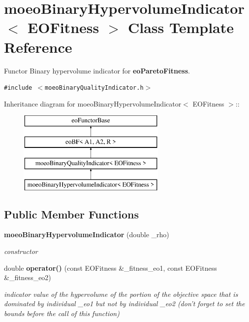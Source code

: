 \section{moeo\-Binary\-Hypervolume\-Indicator$<$ EOFitness $>$ Class Template Reference}
\label{classmoeoBinaryHypervolumeIndicator}
Functor Binary hypervolume indicator for {\bf eo\-Pareto\-Fitness}.  


{\tt \#include $<$moeo\-Binary\-Quality\-Indicator.h$>$}

Inheritance diagram for moeo\-Binary\-Hypervolume\-Indicator$<$ EOFitness $>$::\begin{figure}[H]
\begin{center}
\leavevmode
\includegraphics[height=4cm]{classmoeoBinaryHypervolumeIndicator}
\end{center}
\end{figure}
\subsection*{Public Member Functions}
\begin{CompactItemize}
\item 
{\bf moeo\-Binary\-Hypervolume\-Indicator} (double \_\-rho)
\begin{CompactList}\small\item\em constructor \item\end{CompactList}\item 
double {\bf operator()} (const EOFitness \&\_\-fitness\_\-eo1, const EOFitness \&\_\-fitness\_\-eo2)
\begin{CompactList}\small\item\em indicator value of the hypervolume of the portion of the objective space that is dominated by individual \_\-eo1 but not by individual \_\-eo2 (don't forget to set the bounds before the call of this function) \item\end{CompactList}\end{CompactItemize}

